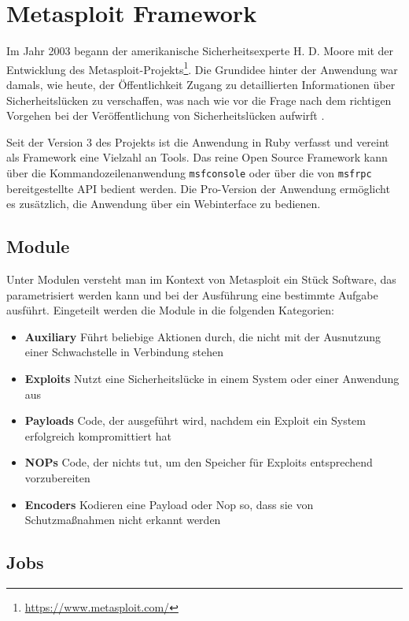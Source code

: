 \section{Metasploit Framework}\label{subsec:metasploit}

Im Jahr 2003 begann der amerikanische Sicherheitsexperte H. D. Moore mit der Entwicklung des Metasploit-Projekts\footnote{\url{https://www.metasploit.com/}}. Die Grundidee hinter der Anwendung war damals, wie heute, der Öffentlichkeit Zugang zu detaillierten Informationen über Sicherheitslücken zu verschaffen, was nach wie vor die Frage nach dem richtigen Vorgehen bei der Veröffentlichung von Sicherheitslücken aufwirft \cite[S.45]{Messner2017}.

Seit der Version 3 des Projekts ist die Anwendung in Ruby verfasst und vereint als Framework eine Vielzahl an Tools. Das reine Open Source Framework kann über die Kommandozeilenanwendung \texttt{msfconsole} oder über die von \texttt{msfrpc} bereitgestellte API bedient werden. Die Pro-Version der Anwendung ermöglicht es zusätzlich, die Anwendung über ein Webinterface zu bedienen.

\subsection{Module}\label{subsec:metasploitmodule}
Unter Modulen versteht man im Kontext von Metasploit ein Stück Software, das parametrisiert werden kann und bei der Ausführung eine bestimmte Aufgabe ausführt. Eingeteilt werden die Module in die folgenden Kategorien:

\begin{itemize}
  \item \textbf{Auxiliary} Führt beliebige Aktionen durch, die nicht mit der Ausnutzung einer Schwachstelle in Verbindung stehen
  \item \textbf{Exploits} Nutzt eine Sicherheitslücke in einem System oder einer Anwendung aus
  \item \textbf{Payloads} Code, der ausgeführt wird, nachdem ein Exploit ein System erfolgreich kompromittiert hat
   \item \textbf{NOPs} Code, der nichts tut, um den Speicher für Exploits entsprechend vorzubereiten
  \item \textbf{Encoders} Kodieren eine Payload oder Nop so, dass sie von Schutzmaßnahmen nicht erkannt werden
\end{itemize}
\cite[]{metasploitglosar}

\subsection{Jobs}\label{subsubsec:auxiliarys}

